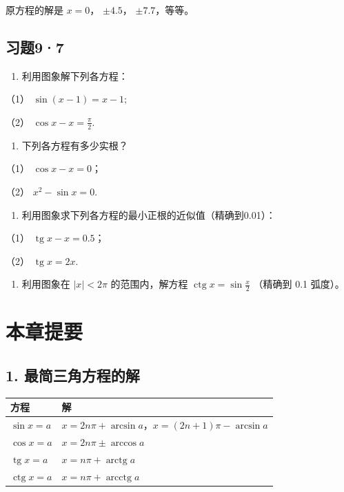 原方程的解是 \(x = 0\)， \(\pm 4.5\)， \(\pm 7.7\)，等等。

\subsection{习题9·7}

\begin{enumerate}
\item
  利用图象解下列各方程：
\end{enumerate}

（1） \(\sin (x - 1) = x - 1;\)

（2） \(\cos x - x = \frac{\pi}{2}\).

\begin{enumerate}[start=2]
\item
  下列各方程有多少实根？
\end{enumerate}

（1） \(\cos x - x = 0\)；

（2） \(x^{2} - \sin x = 0.\)

\begin{enumerate}[start=3]
\item
  利用图象求下列各方程的最小正根的近似值（精确到0.01）：
\end{enumerate}

（1） \(\operatorname{tg} x - x = 0.5\)；

（2） \(\operatorname{tg} x = 2x\).

\begin{enumerate}[start=4]
\item
  利用图象在 \(|x| < 2\pi\) 的范围内，解方程
  \(\operatorname{ctg} x = \sin \frac{x}{2}\) （精确到 0.1 弧度）。
\end{enumerate}

\section{本章提要}

\subsection{1. 最简三角方程的解}

{\def\LTcaptype{none} %
\begin{longtable}[]{@{}ll@{}}
\toprule\noalign{}
方程 & 解 \\
\midrule\noalign{}
\endhead
\bottomrule\noalign{}
\endlastfoot
\(\sin x=a\) & \(x=2n\pi+\arcsin a\)，\(x=(2n+1)\pi-\arcsin a\) \\
\(\cos x=a\) & \(x=2n\pi\pm\arccos a\) \\
\(\operatorname{tg}x=a\) & \(x=n\pi+\operatorname{arctg}a\) \\
\(\operatorname{ctg}x=a\) & \(x=n\pi+\operatorname{arcctg}a\) \\
\end{longtable}
}

